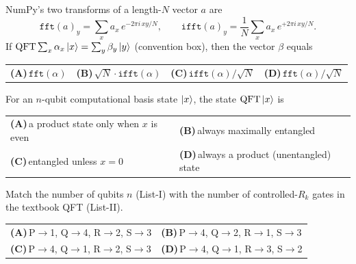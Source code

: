 \documentclass[11pt,a4paper]{article}
\newcommand{\optlabel}[1]{\textbf{(#1)}}
\newenvironment{qitem}[1]{\begin{list}{}{\setlength{\leftmargin}{3.3em}\setlength{\labelwidth}{3.1em}%
  \setlength{\labelsep}{0.2em}\setlength{\topsep}{3pt}\setlength{\parsep}{3pt}}\item[\textbf{Q.#1}\hfill]}{\end{list}}
\newcommand{\qsep}{\par\vspace{2pt}{\color{black!15}\hrule}\vspace{4pt}}
\begin{document}
\begin{qitem}{53}
NumPy's two transforms of a length-$N$ vector $a$ are
\[ \texttt{fft}(a)_y = \sum_x a_x\, e^{-2\pi i\,xy/N}, \qquad \texttt{ifft}(a)_y = \frac1N\sum_x a_x\, e^{+2\pi i\,xy/N}. \]
If $\mathrm{QFT}\sum_x\alpha_x\ket x = \sum_y\beta_y\ket y$ (convention box), then the vector $\beta$ equals
\par\smallskip\noindent\begin{tabularx}{\linewidth}{@{}*{4}{L}@{}}
\optlabel{A}\,$\texttt{fft}(\alpha)$ & \optlabel{B}\,$\sqrt N\cdot\texttt{ifft}(\alpha)$ & \optlabel{C}\,$\texttt{ifft}(\alpha)/\sqrt N$ & \optlabel{D}\,$\texttt{fft}(\alpha)/\sqrt N$
\end{tabularx}
\end{qitem}
\qsep

\begin{qitem}{54}
For an $n$-qubit computational basis state $\ket x$, the state $\mathrm{QFT}\ket x$ is
\par\smallskip\noindent\begin{tabularx}{\linewidth}{@{}*{2}{L}@{}}
\optlabel{A}\,a product state only when $x$ is even & \optlabel{B}\,always maximally entangled \\[3pt]
\optlabel{C}\,entangled unless $x = 0$ & \optlabel{D}\,always a product (unentangled) state
\end{tabularx}
\end{qitem}
\qsep

\begin{qitem}{55}
Match the number of qubits $n$ (List-I) with the number of controlled-$R_k$ gates in the textbook QFT (List-II).
\par\smallskip{}
\par\smallskip\noindent\begin{tabularx}{\linewidth}{@{}*{2}{L}@{}}
\optlabel{A}\,P$\to$1, Q$\to$4, R$\to$2, S$\to$3 & \optlabel{B}\,P$\to$4, Q$\to$2, R$\to$1, S$\to$3 \\[3pt]
\optlabel{C}\,P$\to$4, Q$\to$1, R$\to$2, S$\to$3 & \optlabel{D}\,P$\to$4, Q$\to$1, R$\to$3, S$\to$2
\end{tabularx}
\end{qitem}
\qsep
\end{document}
